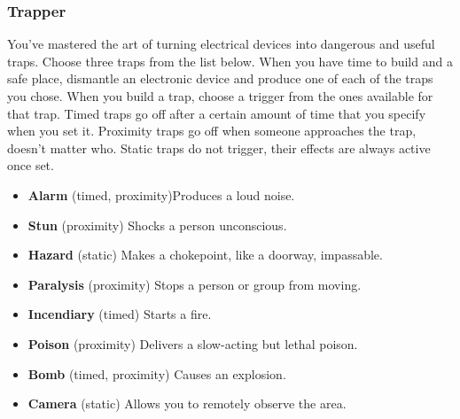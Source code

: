 \subsubsection{Trapper}
You've mastered the art of turning electrical devices into dangerous and useful traps.
Choose three traps from the list below. When you have time to build and a safe place,
dismantle an electronic device and produce one of each of the traps you chose. When you
build a trap, choose a trigger from the ones available for that trap. Timed traps go off
after a certain amount of time that you specify when you set it. Proximity traps go off
when someone approaches the trap, doesn't matter who. Static traps do not trigger,
their effects are always active once set.
\begin{itemize}
\item \textbf{Alarm} (timed, proximity)\hfill Produces a loud noise.
\item \textbf{Stun} (proximity) \hfill Shocks a person unconscious.
\item \textbf{Hazard} (static) \hfill Makes a chokepoint, like a doorway, impassable.
\item \textbf{Paralysis} (proximity) \hfill Stops a person or group from moving.
\item \textbf{Incendiary} (timed) \hfill Starts a fire.
\item \textbf{Poison} (proximity) \hfill Delivers a slow-acting but lethal poison.
\item \textbf{Bomb} (timed, proximity) \hfill Causes an explosion.
\item \textbf{Camera} (static) \hfill Allows you to remotely observe the area.
\end{itemize}




